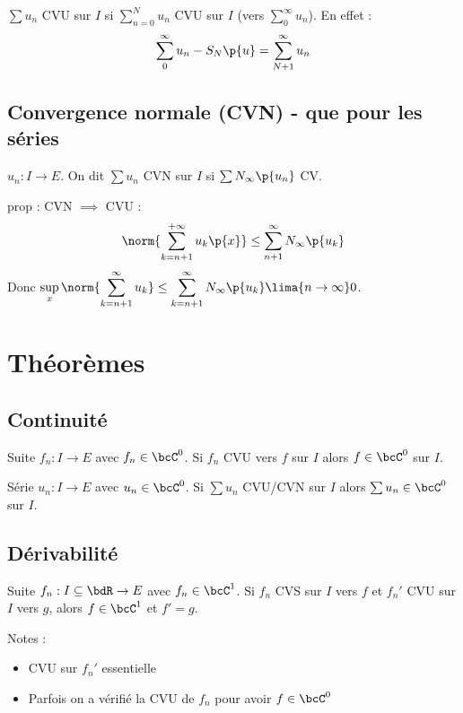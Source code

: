 \documentclass[a4paper,french,bookmarks]{book}
\begin{document}
    $\sum u_n$ CVU sur $I$ si $\sum\limits_{n=0}^N u_n$ CVU sur $I$ (vers $\sum\limits_0^\infty u_n$). En effet :
    \[ \sum_0^\infty u_n - S_N\p{u} = \sum_{N+1}^\infty u_n\]
    
    \subsection{Convergence normale (CVN) - que pour les séries}
    
    $u_n : I \to E$. On dit $\sum u_n$ CVN sur $I$ si $\sum N_\infty\p{u_n}$ CV.
    
    prop : CVN $\implies$ CVU : 
    \[ \norm{\sum_{k=n+1}^{+\infty} u_k\p{x}} \leq \sum_{n+1}^\infty N_\infty\p{u_k}\]
    Donc $\sup\limits_x \displaystyle \norm{\sum_{k=n+1}^\infty u_k} \leq \sum_{k=n+1}^\infty N_\infty\p{u_k} \lima{n \to \infty} 0$.
    
    \section{Théorèmes}
    
    \subsection{Continuité}
    
    Suite $f_n : I \to E$ avec $f_n \in \bcC^0$. Si $f_n$ CVU vers $f$ sur $I$ alors $f \in \bcC^0$ sur $I$.
    
    Série $u_n : I \to E$ avec $u_n \in \bcC^0$. Si $\sum u_n$ CVU/CVN sur $I$ alors $\sum u_n \in \bcC^0$ sur $I$.
    
    \subsection{Dérivabilité}
    
    Suite $f_n : I \subseteq \bdR \to E$ avec $f_n \in \bcC^1$. Si $f_n$ CVS sur $I$ vers $f$ et $f_n'$ CVU sur $I$ vers $g$, alors $f \in \bcC^1$ et $f' = g$.
    
    Notes :
    \begin{itemize}
        \item CVU sur $f_n'$ essentielle
        \item Parfois on a vérifié la CVU de $f_n$ pour avoir $f \in \bcC^0$
    \end{itemize}
    
\end{document}

